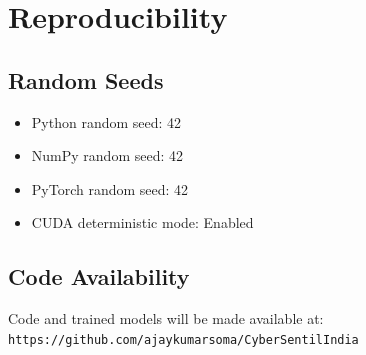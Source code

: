 \documentclass[10pt,a4paper]{article}
\begin{document}
\section{Reproducibility}

\subsection{Random Seeds}
\begin{itemize}
\item Python random seed: 42
\item NumPy random seed: 42
\item PyTorch random seed: 42
\item CUDA deterministic mode: Enabled
\end{itemize}

\subsection{Code Availability}
Code and trained models will be made available at:\\
\texttt{https://github.com/ajaykumarsoma/CyberSentilIndia}
\end{document}
